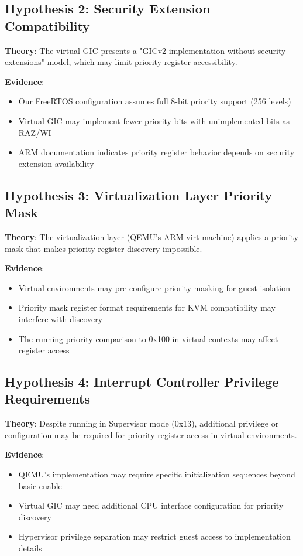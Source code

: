 \documentclass[12pt,a4paper]{article}
\begin{document}
\subsection{Hypothesis 2: Security Extension Compatibility}

\textbf{Theory}: The virtual GIC presents a "GICv2 implementation without security extensions" model, which may limit priority register accessibility.

\textbf{Evidence}:
\begin{itemize}
    \item Our FreeRTOS configuration assumes full 8-bit priority support (256 levels)
    \item Virtual GIC may implement fewer priority bits with unimplemented bits as RAZ/WI
    \item ARM documentation indicates priority register behavior depends on security extension availability
\end{itemize}

\subsection{Hypothesis 3: Virtualization Layer Priority Mask}

\textbf{Theory}: The virtualization layer (QEMU's ARM virt machine) applies a priority mask that makes priority register discovery impossible.

\textbf{Evidence}:
\begin{itemize}
    \item Virtual environments may pre-configure priority masking for guest isolation
    \item Priority mask register format requirements for KVM compatibility may interfere with discovery
    \item The running priority comparison to 0x100 in virtual contexts may affect register access
\end{itemize}

\subsection{Hypothesis 4: Interrupt Controller Privilege Requirements}

\textbf{Theory}: Despite running in Supervisor mode (0x13), additional privilege or configuration may be required for priority register access in virtual environments.

\textbf{Evidence}:
\begin{itemize}
    \item QEMU's implementation may require specific initialization sequences beyond basic enable
    \item Virtual GIC may need additional CPU interface configuration for priority discovery
    \item Hypervisor privilege separation may restrict guest access to implementation details
\end{itemize}
\end{document}
